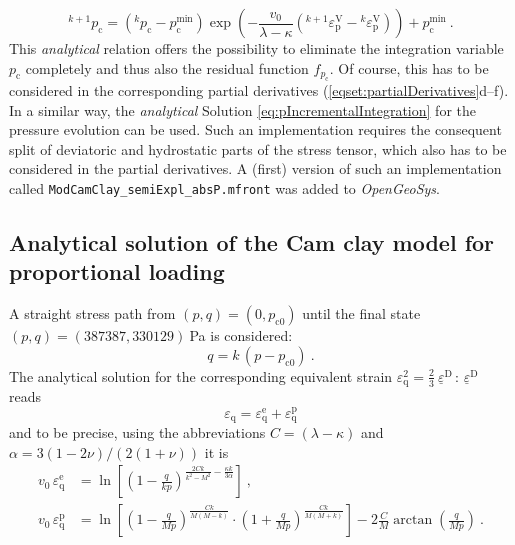 \documentclass[paper=a4, twoside, pagesize]{scrartcl}
\newcommand{\tensor}[1]{\underline{#1}}
\newcommand{\ppkt}{\,\colon\,}
\newcommand{\D}{\text{D}}
\renewcommand{\c}{\text{c}}
\newcommand{\e}{\text{e}}
\newcommand{\p}{\text{p}}
\newcommand{\minus}{-}
\begin{document}
\begin{equation}\label{eq:pcIncrementalIntegration}
    {}^{k+1}p_\c = \left({}^k p_\c - p^\text{min}_\c\right) \exp\left(\minus\frac{v_0}{\lambda-\kappa}\left({}^{k+1}\varepsilon_\p^\text{V}-{}^k\varepsilon_\p^\text{V}\right)\right) + p^\text{min}_\c \ .
\end{equation}
This \emph{analytical} relation offers the possibility to eliminate the integration variable $p_\c$ completely and thus also the residual function $f_{p_\c}$. Of course, this has to be considered in the corresponding partial derivatives {(\ref{eqset:partialDerivatives}d--f)}. In a similar way, the \emph{analytical} Solution \eqref{eq:pIncrementalIntegration} for the pressure evolution can be used.
Such an implementation requires the consequent split of deviatoric and hydrostatic parts of the stress tensor, which also has to be considered in the partial derivatives. A (first) version of such an implementation called \texttt{ModCamClay\_semiExpl\_absP.mfront} was added to \textsl{OpenGeoSys}.


\subsection{Analytical solution of the Cam clay model for proportional loading}
\label{subsec:AppSolutionPeric}

A straight stress path from $(p,q)=(0, p_{\c0})$ until the final state $(p,q)=(387387, 330129)\ $Pa is considered:
\begin{equation}
    q = k\,(p-p_{\c0}) \ .
\end{equation}
The analytical solution \cite{Peric2006} for the corresponding equivalent strain $\varepsilon_{\text{q}}^2= {\tfrac{2}{3}\ \tensor\varepsilon^\D\ppkt\tensor\varepsilon^\D}$ reads
\begin{equation}
    \varepsilon_{\text{q}} = \varepsilon^\e_{\text{q}} + \varepsilon^\p_{\text{q}}
\end{equation}
and to be precise, using the abbreviations $C = (\lambda\minus\kappa)$ and $\alpha = 3(1-2\nu) / (2(1+\nu))$ it is
\begin{align}
    v_0\,\varepsilon^\e_{\text{q}} &= \ln\left[\left(1-\frac{q}{kp}\right)^{\frac{2Ck}{k^2-M^2}-\frac{\kappa k}{3\alpha}}\right]\ ,\\
    v_0\,\varepsilon^\p_{\text{q}} &= \ln\left[\left(1-\frac{q}{Mp}\right)^{\frac{Ck}{M(M-k)}} 
                                          \cdot\left(1+\frac{q}{Mp}\right)^{\frac{Ck}{M(M+k)}}\right]
                                          - 2 \frac{C}{M}\arctan\left(\frac{q}{Mp}\right)\ .
\end{align}
\end{document}
